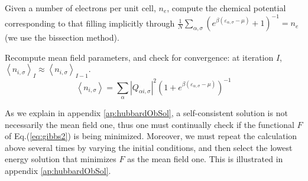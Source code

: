 Given a number of electrons per unit cell, $n_e$, compute the chemical potential corresponding to that filling implicitly through $ \frac{1}{N} \sum_{\alpha, \sigma} (  e^{\beta ( \varepsilon_{\alpha, \sigma} - \mu ) } +1 )^{-1} = n_e$ (we use the bissection method).

Recompute mean field parameters, and check for convergence: at iteration $I$, $\left\langle n_{i,\sigma} \right\rangle_I \approx \left\langle n_{i,\sigma} \right\rangle_{I - 1}$.
\begin{equation}\label{eq:selfConsistent}
\left\langle n_{i,\sigma} \right\rangle = \sum_\alpha | Q_{\alpha i, \sigma} |^2 ( 1 + e^ { \beta ( \varepsilon_{\alpha, \sigma} - \mu )} )^{-1}
\end{equation}

As we explain in appendix \ref{ap:hubbardObSol}, a self-consistent solution is not necessarily the mean field one, thus one must continually check if the functional $F$ of Eq.(\ref{eq:gibbs2}) is being minimized.
Moreover, we must repeat the calculation above several times by varying the initial conditions, and then select the lowest energy solution that minimizes $F$ as the mean field one.
This is illustrated in appendix \ref{ap:hubbardObSol}.

